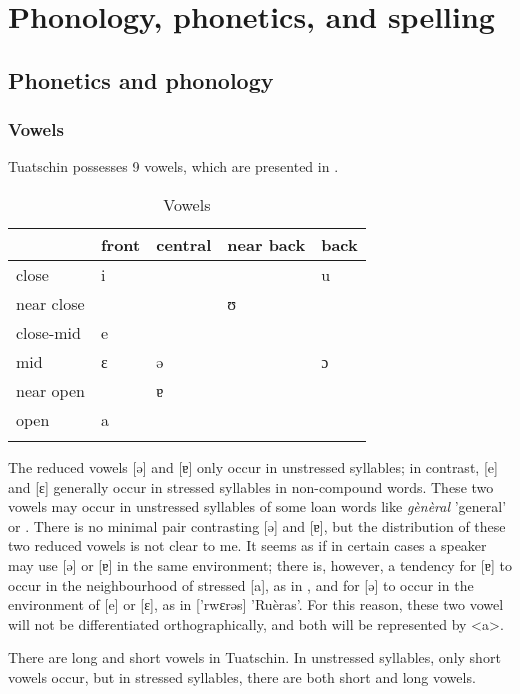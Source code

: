 \chapter{Phonology, phonetics, and spelling}

\section{Phonetics and phonology}

\subsection{Vowels}
Tuatschin possesses 9 vowels, which are presented in .

\begin{table}
\caption{Vowels}
\label{vow}
 \begin{tabular}{lllll}
  \lsptoprule
            &  front& central  & near back & back \\
  \midrule
 close   &  i  &      &   &    u    \\
 near close    &   &      & ʊ &  \\
close-mid    &  e  &   &  &       \\
mid    & ɛ   & ə  &        & ɔ\\
near open    &    &  ɐ   &        \\
open    &   a  &        \\
  \lspbottomrule
 \end{tabular}
\end{table}

The reduced vowels [ə] and [ɐ] only occur in unstressed syllables; in contrast, [e] and [ɛ] generally occur in stressed syllables in non-compound words. These two vowels may occur in unstressed syllables of some loan words like \textit{gènèral} 'general' or .
There is no minimal pair contrasting [ə] and [ɐ], but the distribution of these two reduced vowels is not clear to me. It seems as if in certain cases a speaker may use [ə] or [ɐ] in the same environment; there is, however, a tendency for [ɐ] to occur in the neighbourhood of stressed [a], as in , and for [ə] to occur in the environment of [e] or [ɛ], as in ['rwɛrəs] 'Ruèras'. For this reason, these two vowel will not be differentiated orthographically, and both will be represented by <a>.

There are long and short vowels in Tuatschin. In unstressed syllables, only short vowels occur, but in stressed syllables, there are both short and long vowels. 


